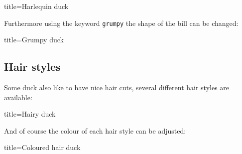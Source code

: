 \documentclass[parskip=half]{scrartcl}
\begin{document}
\begin{tcblisting}{title={Harlequin duck}}
\begin{tikzpicture}
	\duck[body=yellow,
		head=yellow!50!orange, 
		bill=red,
		eye=green]
\end{tikzpicture}
\end{tcblisting}

Furthermore using the keyword \lstinline|grumpy| the shape of the bill can be changed:

\begin{tcblisting}{title={Grumpy duck}}
\begin{tikzpicture}
	\duck[grumpy]
\end{tikzpicture}
\begin{tikzpicture}
	\duck[grumpy, bill=cyan]
\end{tikzpicture}
\end{tcblisting}

\clearpage
\subsection{Hair styles}

Some duck also like to have nice hair cuts, several different hair styles are available:
\begin{tcblisting}{title={Hairy duck}}
\begin{tikzpicture}
	\duck[longhair]
\end{tikzpicture}
\begin{tikzpicture}
	\duck[shorthair]
\end{tikzpicture}

\begin{tikzpicture}
	\duck[crazyhair]
\end{tikzpicture}
\begin{tikzpicture}
	\duck[recedinghair]
\end{tikzpicture}

\begin{tikzpicture}
	\duck[mohican]
\end{tikzpicture}
\begin{tikzpicture}
	\duck[mullet]
\end{tikzpicture}
\end{tcblisting}

And of course the colour of each hair style can be adjusted:
\begin{tcblisting}{title={Coloured hair duck}}
\begin{tikzpicture}
	\duck[longhair=teal]
\end{tikzpicture}
\end{tcblisting}
\end{document}
